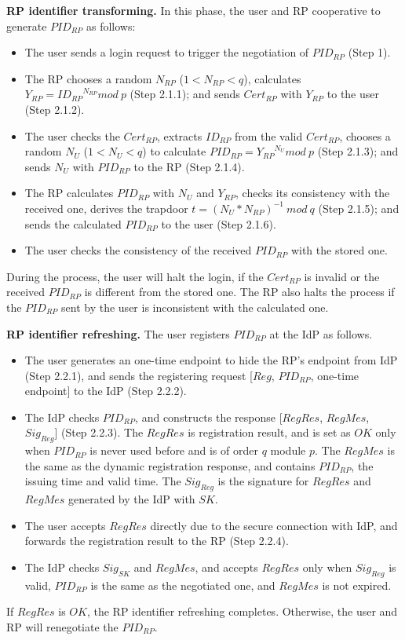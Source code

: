 \vspace{1mm}\noindent\textbf{RP identifier transforming.}
In this phase, the user and RP cooperative to generate $PID_{RP}$ as follows:
\begin{itemize}
  \item The user sends a login request to trigger the negotiation of $PID_{RP}$ (Step 1).
  \item The RP chooses a random $N_{RP}$ ($1 < N_{RP} <q$), calculates $Y_{RP}={ID_{RP}}^{N_{RP}} mod \ p$ (Step 2.1.1); and sends $Cert_{RP}$ with $Y_{RP}$ to the user (Step 2.1.2).
  \item The user checks the $Cert_{RP}$, extracts $ID_{RP}$ from the valid $Cert_{RP}$, chooses a random $N_U$ ($1 < N_U <q$) to calculate $PID_{RP}={Y_{RP}}^{N_{U}} mod \ p$ (Step 2.1.3); and sends $N_U$ with $PID_{RP}$ to the RP (Step 2.1.4).
  \item The RP calculates $PID_{RP}$ with $N_U$ and $Y_{RP}$, checks its consistency with the received one, derives the trapdoor $t={(N_U*N_{RP})}^{-1} \ mod \ q$ (Step 2.1.5); and sends the calculated $PID_{RP}$ to the user (Step 2.1.6).
  \item The user checks the consistency of the received $PID_{RP}$ with the stored one.
\end{itemize}
During the process, the user will halt the login, if  the $Cert_{RP}$ is invalid or the received $PID_{RP}$ is different from the stored one. The RP also halts the process if the $PID_{RP}$ sent by the user is inconsistent with the calculated one.

\vspace{1mm}\noindent\textbf{RP identifier refreshing.}
The user registers $PID_{RP}$ at the IdP as follows.
\begin{itemize}
  \item The user generates an one-time endpoint to hide the RP's endpoint from IdP (Step 2.2.1), and sends the registering request [$Reg$, $PID_{RP}$, one-time endpoint] to the IdP (Step 2.2.2).
  \item The IdP checks $PID_{RP}$, and constructs the response [$RegRes$, $RegMes$, $Sig_{Reg}$] (Step 2.2.3). The $RegRes$ is registration result, and is set as $OK$ only when $PID_{RP}$ is never used before and is of order $q$ module $p$. The $RegMes$ is the same as the dynamic registration response, and contains $PID_{RP}$, the issuing time and valid time. The $Sig_{Reg}$ is the signature for $RegRes$ and $RegMes$ generated by the IdP with $SK$.
  \item The user accepts $RegRes$ directly due to the secure connection with IdP, and forwards the registration result to the RP (Step 2.2.4).
  \item The IdP checks $Sig_{SK}$ and $RegMes$, and accepts $RegRes$ only when $Sig_{Reg}$ is valid, $PID_{RP}$ is the same as the negotiated one, and $RegMes$ is not expired.
\end{itemize}
If $RegRes$ is $OK$, the RP identifier refreshing completes. Otherwise, the user and RP will renegotiate the $PID_{RP}$.

